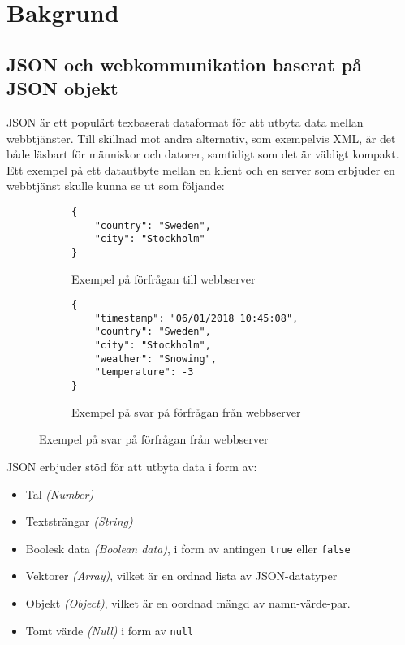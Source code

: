 \documentclass[swedish]{kththesis}
\begin{document}
\section{Bakgrund}


\subsection{JSON och webkommunikation baserat på JSON objekt}
\label{sec:intr:bakgrund:json}
JSON är ett populärt texbaserat dataformat för att utbyta data mellan webbtjänster. Till skillnad mot andra alternativ, som exempelvis XML, är det både läsbart för människor och datorer, samtidigt som det är väldigt kompakt. \cite{Pezoa2016} Ett exempel på ett datautbyte mellan en klient och en server som erbjuder en webbtjänst skulle kunna se ut som följande:

\begin{figure}[h!]
	\centering
	\begin{subfigure}[t]{\textwidth}
		\centering
		\begin{verbatim}
{
	"country": "Sweden",
	"city": "Stockholm"
}
		\end{verbatim}
		\vspace{-1em}
		\caption{Exempel på förfrågan till webbserver}
		\vspace{2em}
	\end{subfigure}
	\begin{subfigure}[t]{\textwidth}
		\centering
		\begin{verbatim}
{
	"timestamp": "06/01/2018 10:45:08",
	"country": "Sweden",
	"city": "Stockholm",
	"weather": "Snowing",
	"temperature": -3
}
		\end{verbatim}
		\vspace{-1em}
		\caption{Exempel på svar på förfrågan från webbserver}
		\vspace{2em}
	\end{subfigure}
\end{figure}

JSON erbjuder stöd för att utbyta data i form av:

\begin{itemize}
	\item Tal \textit{(Number)}
	\item Textsträngar \textit{(String)}
	\item Boolesk data \textit{(Boolean data)}, i form av antingen \texttt{true} eller \texttt{false}
	\item Vektorer \textit{(Array)}, vilket är en ordnad lista av JSON-datatyper
	\item Objekt \textit{(Object)}, vilket är en oordnad mängd av namn-värde-par.
	\item Tomt värde \textit{(Null)} i form av \texttt{null}
	\cite{ECMA2013}
\end{itemize}
\end{document}
